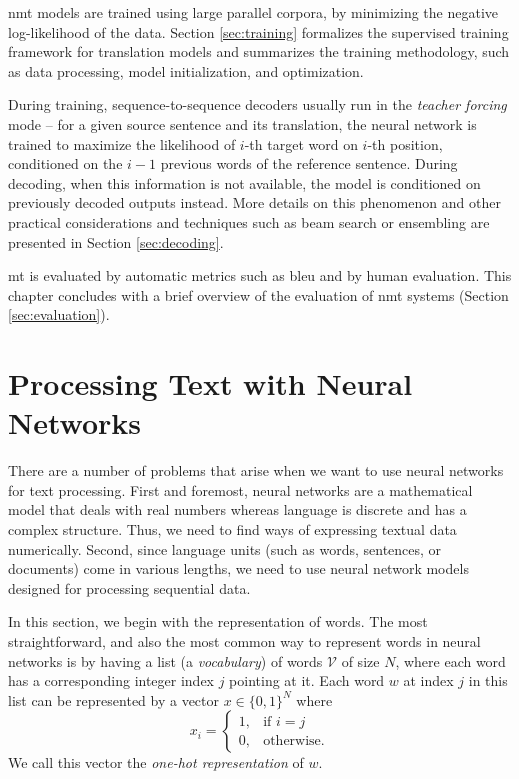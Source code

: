 \ac{nmt} models are trained using large parallel corpora, by minimizing the
negative log-likelihood of the data.  Section \ref{sec:training} formalizes the
supervised training framework for translation models and summarizes the
training methodology, such as data processing, model initialization, and
optimization.

During training, sequence-to-sequence decoders usually run in the \emph{teacher
  forcing} mode -- for a given source sentence and its translation, the neural
network is trained to maximize the likelihood of $i$-th target word on $i$-th
position, conditioned on the $i-1$ previous words of the reference
sentence. During decoding, when this information is not available, the model is
conditioned on previously decoded outputs instead. More details on this
phenomenon and other practical considerations and techniques such as beam
search or ensembling are presented in Section \ref{sec:decoding}.


\Ac{mt} is evaluated by automatic metrics such as \acs{bleu} and by human
evaluation. This chapter concludes with a brief overview of the evaluation of
\ac{nmt} systems (Section \ref{sec:evaluation}).

\section{Processing Text with Neural Networks}
\label{sec:text-processing}

There are a number of problems that arise when we want to use neural networks
for text processing. First and foremost, neural networks are a mathematical
model that deals with real numbers whereas language is discrete and has a
complex structure. Thus, we need to find ways of expressing textual data
numerically. Second, since language units (such as words, sentences, or
documents) come in various lengths, we need to use neural network models
designed for processing sequential data.

In this section, we begin with the representation of words. The most
straightforward, and also the most common way to represent words in neural
networks is by having a list (a \emph{vocabulary}) of words $\mathcal{V}$ of
size $N$, where each word has a corresponding integer index $j$ pointing at
it. Each word $w$ at index $j$ in this list can be represented by a vector
$x \in \{0,1\}^N$ where
%
\begin{equation} x_i =
\begin{cases} 1, & \text{if } i = j \\ 0, & \text{otherwise.}
\end{cases}
\end{equation}
%
We call this vector the \emph{one-hot representation} of $w$.

